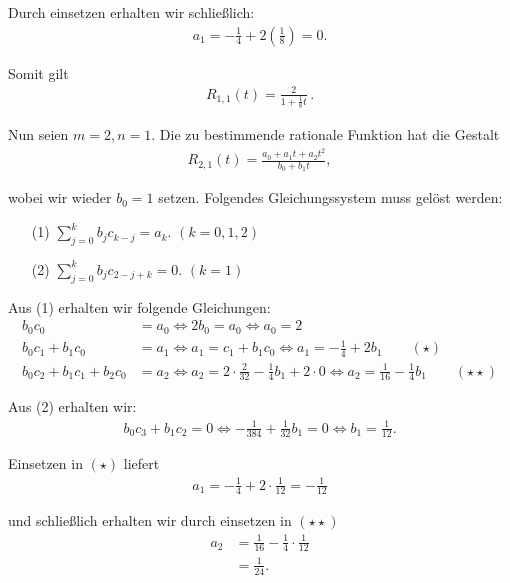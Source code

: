 \documentclass[a4paper]{article}
\begin{document}
    Durch einsetzen erhalten wir schließlich:
    \begin{align*}
      a_1 = -\frac{1}{4} + 2\left(\frac{1}{8}\right) = 0.
    \end{align*}

    Somit gilt 
    \begin{align*}
      R_{1,1}(t) = \frac{2}{1+\frac{1}{8}t}\,.
    \end{align*}

    Nun seien $m=2, n=1$. Die zu bestimmende rationale Funktion hat die Gestalt
    \begin{align*}
      R_{2,1}(t) = \frac{a_0 + a_1t + a_2t^2}{b_0 + b_1t},
    \end{align*}

    wobei wir wieder $b_0 = 1$ setzen. Folgendes Gleichungssystem muss gelöst werden:
    \begin{enumerate}
      \item[(1)] $\sum_{j=0}^{k} b_j c_{k-j} = a_k$. \quad $(k = 0,1,2)$
      \item[(2)] $\sum_{j=0}^{k} b_j c_{2-j+k} = 0$. \quad $(k = 1)$
    \end{enumerate}

    Aus (1) erhalten wir folgende Gleichungen:
    \begin{align*}
      b_0c_0 &= a_0 \iff 2b_0 = a_0 \iff a_0 = 2   \\
      b_0c_1 + b_1c_0 &= a_1 \iff a_1 = c_1 + b_1c_0 \iff a_1 = -\frac{1}{4} + 2b_1 \qquad (\star) \\
      b_0c_2 + b_1c_1 + b_2c_0 &= a_2 \iff a_2 = 2\cdot \frac{2}{32} - \frac{1}{4}b_1 + 2\cdot 0
                                      \iff a_2 = \frac{1}{16} - \frac{1}{4}b_1 \qquad (\star\star)
    \end{align*}

    Aus (2) erhalten wir:
    \begin{align*}
      b_0c_3 + b_1c_2 = 0 \iff -\frac{1}{384} + \frac{1}{32}b_1 = 0 \iff b_1 = \frac{1}{12}.
    \end{align*}

    Einsetzen in $(\star)$ liefert 
    \begin{align*}
      a_1 = -\frac{1}{4} + 2\cdot \frac{1}{12} = -\frac{1}{12}
    \end{align*}

    und schließlich erhalten wir durch einsetzen in $(\star\star)$
    \begin{align*}
      a_2 &= \frac{1}{16} - \frac{1}{4}\cdot \frac{1}{12}  \\
          &= \frac{1}{24}.
    \end{align*}
\end{document}
